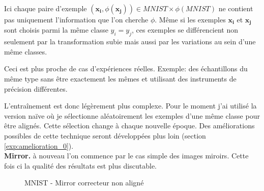 
Ici chaque paire d'exemple $(\pmb{x_i}, \phi(\pmb{x_j})) \in MNIST\times \phi(MNIST)$
ne contient pas uniquement l'information que l'on cherche $\phi$. Même si
les exemples $\pmb{x_i}$ et $\pmb{x_j}$ sont choisis parmi la même classe
$y_i=y_j$, ces exemples se différencient non seulement par la transformation 
subie mais aussi par les variations au sein d'une même classes.

Ceci est plus proche de cas d'expériences réelles. Exemple: des échantillons
du même type sans être exactement les mêmes et utilisant des instruments
de précision différentes.

L'entraînement est donc légèrement plus complexe. Pour le moment j'ai utilisé 
la version naïve où je sélectionne aléatoirement les exemples d'une même classe
pour être alignés. Cette sélection change à chaque nouvelle époque. Des 
améliorations possibles de cette technique seront développées plus loin
(section \ref{exp:amelioration_0}).\\


{\Large\textbf{Mirror.}} à nouveau l'on commence par le cas simple des images 
miroirs. Cette fois ci la qualité des résultats est plus discutable. 

\begin{figure}[H] %
\centering
{}
\hfill
{}
\caption{MNIST - Mirror correcteur non aligné}
\label{fig:mnist_mirror_classwise}
\end{figure}


